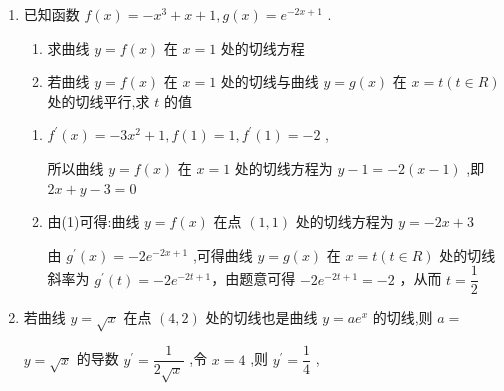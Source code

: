 \begin{enumerate}
\begin{enumerate}
\begin{jieda}
            所以 $1 - 3\ln 1 =  - 1 - m$ ,解得 $m =  - 2$ .
            
            由 $f\left( x\right)  = {x}^{3} + {nx} - {52}$ 知 $f\left( x\right)  = 3{x}^{2} + n$ ，又两曲线的公切线斜率为 -1，则 $3{a}^{2} + n =  - 1$ ，即 $n =  - 3{a}^{2} - 1$ ，故 ${a}^{3} - \left( {3{a}^{2} + 1}\right) a - {52} =  - a + 2$ ,整理得 ${a}^{3} =  - {27}$ ,故 $a =  - 3$ ,
            
            所以 $n =  - 3{a}^{2} - 1 =  - {28}$ ,故 $m - n = {26}$ .
        \end{jieda}
        
        \item 已知函数 $f\left( x\right)  =  - {x}^{3} + x + 1,g\left( x\right)  = {{e}}^{-{2x} + 1}$ .
        \begin{enumerate}
            \item 求曲线 $y = f\left( x\right)$ 在 $x = 1$ 处的切线方程
            \item 若曲线 $y = f\left( x\right)$ 在 $x = 1$ 处的切线与曲线 $y = g\left( x\right)$ 在 $x = t\left( {t \in  {R}}\right)$ 处的切线平行,求 $t$ 的值
        \end{enumerate}
        \begin{jieda}
            \begin{enumerate}
                \item ${f}^{\prime }\left( x\right)  =  - 3{x}^{2} + 1,f\left( 1\right)  = 1,{f}^{\prime }\left( 1\right)  =  - 2$ ,

                所以曲线 $y = f\left( x\right)$ 在 $x = 1$ 处的切线方程为 $y - 1 =  - 2\left( {x - 1}\right)$ ,即 ${2x} + y - 3 = 0$

                \item 由(1)可得:曲线 $y = f\left( x\right)$ 在点 $\left( {1,1}\right)$ 处的切线方程为 $y =  - {2x} + 3$ 
                
                由 ${g}^{\prime }\left( x\right)  =  - 2{{e}}^{-{2x} + 1}$ ,可得曲线 $y = g\left( x\right)$ 在 $x = t\left( {t \in  {R}}\right)$ 处的切线斜率为 ${g}^{\prime }\left( t\right)  =  - 2{{e}}^{-{2t} + 1}$，由题意可得 $- 2{{e}}^{-{2t} + 1} =  - 2$ ，从而 $t = \dfrac{1}{2}$
            \end{enumerate}
        \end{jieda}
        
        \item 若曲线 $y = \sqrt{x}$ 在点 $\left( {4,2}\right)$ 处的切线也是曲线 $y = a{{e}}^{x}$ 的切线,则 $a =$
        \begin{jieda}
            $y = \sqrt{x}$ 的导数 ${y}^{\prime } = \dfrac{1}{2\sqrt{x}}$ ,令 $x = 4$ ,则 ${y}^{\prime } = \dfrac{1}{4}$ ,


\end{jieda}
\end{enumerate}
\end{enumerate}
